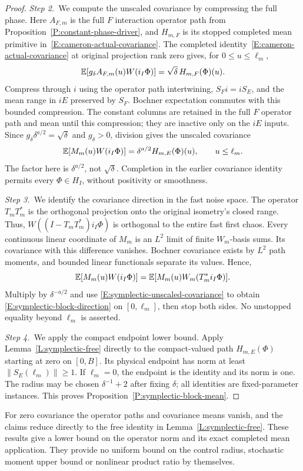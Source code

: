 \begin{proof}
  \medskip
  \noindent\textit{Step 2.~}We compute the unscaled covariance by compressing
  the full phase.
  Here $A_{F,m}$ is the full $F$ interaction operator path from
  Proposition~\ref{P:constant-phase-driver}, and $H_{m,F}$ is its stopped
  completed mean primitive in~\eqref{E:cameron-actual-covariance}. The completed
  identity~\eqref{E:cameron-actual-covariance} at original projection rank zero
  gives, for $0 \le u \le \ell_m$,
  \[
    \mathbb{E}[g_\delta A_{F,m}(u)W(i_I\Phi)]
    =\sqrt\delta\,H_{m,F}(\Phi)(u).
  \]
  Compress through $i$ using the operator path intertwining, $S_Fi = iS_E$, and
  the mean range in $iE$ preserved by $S_F$. Bochner expectation commutes with
  this bounded compression. The constant columns are retained in the full $F$
  operator path and mean until this compression; they are inactive only on the
  $iE$ inputs. Since $g_\delta\delta^{a/2} = \sqrt\delta$ and $g_\delta > 0$,
  division gives the unscaled covariance
  \begin{equation}\label{E:symplectic-unscaled-covariance}
    \mathbb{E}[M_m(u)W(i_I\Phi)]
    =\delta^{a/2}H_{m,E}(\Phi)(u),\qquad u\le\ell_m .
  \end{equation}
  The factor here is $\delta^{a/2}$, not $\sqrt\delta$. Completion in the
  earlier covariance identity permits every $\Phi \in H_I$, without positivity
  or smoothness.


  \medskip
  \noindent\textit{Step 3.~}We identify the covariance direction in the fast
  noise space.
  The operator $T_mT_m^*$ is the orthogonal projection onto the original
  isometry's closed range. Thus, $W((I-T_mT_m^*)i_I\Phi)$ is orthogonal to the
  entire fast first chaos. Every continuous linear coordinate of $M_m$ is an
  $L^2$ limit of finite $W_m$-basis sums. Its covariance with this difference
  vanishes. Bochner covariance exists by $L^2$ path moments, and bounded linear
  functionals separate its values. Hence,
  \[
    \mathbb{E}[M_m(u)W(i_I\Phi)]
    =\mathbb{E}[M_m(u)W_m(T_m^*i_I\Phi)] .
  \]
  Multiply by $\delta^{-a/2}$ and use \eqref{E:symplectic-unscaled-covariance}
  to obtain \eqref{E:symplectic-block-direction} on $[0,\ell_m]$, then stop both
  sides. No unstopped equality beyond $\ell_m$ is asserted.


  \medskip
  \noindent\textit{Step 4.~}We apply the compact endpoint lower bound.
  Apply Lemma~\ref{L:symplectic-free} directly to the compact-valued path
  $H_{m,E}(\Phi)$ starting at zero on $[0,B]$. Its physical endpoint has norm at
  least $\|S_E(\ell_m)\| \ge 1$. If $\ell_m = 0$, the endpoint is the identity
  and its norm is one. The radius may be chosen $\delta^{-1}+2$ after fixing
  $\delta$; all identities are fixed-parameter instances. This proves
  Proposition~\ref{P:symplectic-block-mean}.
\end{proof}

For zero covariance the operator paths and covariance means vanish, and the
claims reduce directly to the free identity in Lemma~\ref{L:symplectic-free}.
These results give a lower bound on the operator norm and its exact completed
mean application. They provide no uniform bound on the control radius,
stochastic moment upper bound or nonlinear product ratio by themselves.
